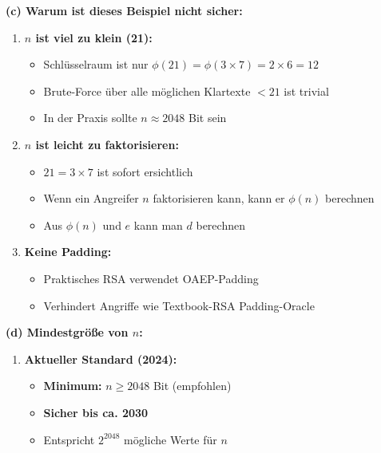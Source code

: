 \documentclass[12pt,a4paper]{article}
\begin{document}
\begin{tcolorbox}[colback=solutionbg, colframe=black!30]

\textbf{(c) Warum ist dieses Beispiel nicht sicher:} \checkmark

\begin{enumerate}[1.]
    \item \textbf{$n$ ist viel zu klein (21):}
    \begin{itemize}
        \item Schlüsselraum ist nur $\phi(21) = \phi(3 \times 7) = 2 \times 6 = 12$
        \item Brute-Force über alle möglichen Klartexte $< 21$ ist trivial
        \item In der Praxis sollte $n \approx 2048$ Bit sein
    \end{itemize}
    
    \item \textbf{$n$ ist leicht zu faktorisieren:}
    \begin{itemize}
        \item $21 = 3 \times 7$ ist sofort ersichtlich
        \item Wenn ein Angreifer $n$ faktorisieren kann, kann er $\phi(n)$ berechnen
        \item Aus $\phi(n)$ und $e$ kann man $d$ berechnen
    \end{itemize}
    
    \item \textbf{Keine Padding:}
    \begin{itemize}
        \item Praktisches RSA verwendet OAEP-Padding
        \item Verhindert Angriffe wie Textbook-RSA Padding-Oracle
    \end{itemize}
\end{enumerate}

\textbf{(d) Mindestgröße von $n$:} \checkmark

\begin{enumerate}[1.]
    \item \textbf{Aktueller Standard (2024):}
    \begin{itemize}
        \item \textbf{Minimum:} $n \geq 2048$ Bit (empfohlen)
        \item \textbf{Sicher bis ca. 2030}
        \item Entspricht $2^{2048}$ mögliche Werte für $n$
    \end{itemize}
    

\end{enumerate}
\end{tcolorbox}
\end{document}
